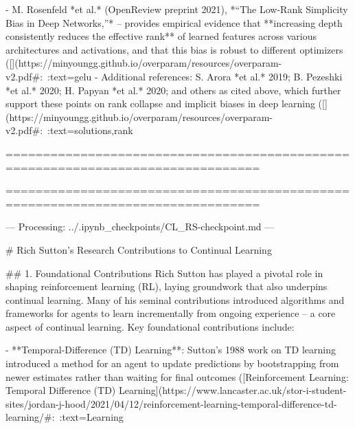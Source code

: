- M. Rosenfeld *et al.* (OpenReview preprint 2021), *“The Low-Rank Simplicity Bias in Deep Networks,”* – provides empirical evidence that **increasing depth consistently reduces the effective rank** of learned features across various architectures and activations, and that this bias is robust to different optimizers ([](https://minyoungg.github.io/overparam/resources/overparam-v2.pdf#:~:text=gelu%
- Additional references: S. Arora *et al.* 2019; B. Pezeshki *et al.* 2020; H. Papyan *et al.* 2020; and others as cited above, which further support these points on rank collapse and implicit biases in deep learning ([](https://minyoungg.github.io/overparam/resources/overparam-v2.pdf#:~:text=solutions,rank%

================================================================================






================================================================================

--- Processing: ../.ipynb_checkpoints/CL_RS-checkpoint.md ---

# Rich Sutton's Research Contributions to Continual Learning

## 1. Foundational Contributions
Rich Sutton has played a pivotal role in shaping reinforcement learning (RL), laying groundwork that also underpins continual learning. Many of his seminal contributions introduced algorithms and frameworks for agents to learn incrementally from ongoing experience – a core aspect of continual learning. Key foundational contributions include:

- **Temporal-Difference (TD) Learning**: Sutton’s 1988 work on TD learning introduced a method for an agent to update predictions by bootstrapping from newer estimates rather than waiting for final outcomes ([Reinforcement Learning: Temporal Difference (TD) Learning](https://www.lancaster.ac.uk/stor-i-student-sites/jordan-j-hood/2021/04/12/reinforcement-learning-temporal-difference-td-learning/#:~:text=Learning%


